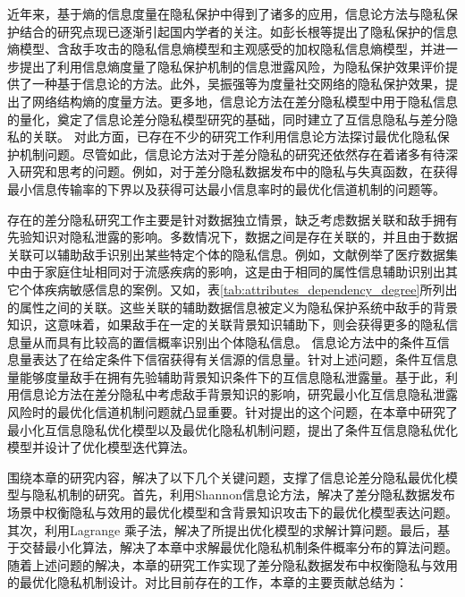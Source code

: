 近年来，基于熵的信息度量在隐私保护中得到了诸多的应用\cite{issa2016an,liao2019tunable,Chatzikokolakis2008Anonymity,sankar2013utility}，信息论方法与隐私保护结合的研究点现已逐渐引起国内学者的关注。如彭长根等\cite{peng2016}提出了隐私保护的信息熵模型、含敌手攻击的隐私信息熵模型和主观感受的加权隐私信息熵模型，并进一步提出了利用信息熵度量了隐私保护机制的信息泄露风险，为隐私保护效果评价提供了一种基于信息论的方法。此外，吴振强等\cite{zhenqiangwu2019}为度量社交网络的隐私保护效果，提出了网络结构熵的度量方法。更多地，信息论方法在差分隐私模型中用于隐私信息的量化，奠定了信息论差分隐私模型研究的基础\cite{mir2012information}，同时建立了互信息隐私与差分隐私的关联\cite{cuff2016differential}。 对此方面，已存在不少的研究工作\cite{kalantari2018robust,alvim2011differential,wang2016on,sarwate2014a,wang2015a,du2015Fundamental,xiong2016randomized}利用信息论方法探讨最优化隐私保护机制问题\cite{kalantari2016optimal,kairouz2016extremal}。尽管如此，信息论方法对于差分隐私的研究还依然存在着诸多有待深入研究和思考的问题。例如，对于差分隐私数据发布中的隐私与失真函数\cite{wang2016on}，在获得最小信息传输率的下界以及获得可达最小信息率时的最优化信道机制的问题等。

存在的差分隐私研究工作主要是针对数据独立情景，缺乏考虑数据关联和敌手拥有先验知识对隐私泄露的影响\cite{zhu2015correlated,li2019impact}。多数情况下，数据之间是存在关联的，并且由于数据关联可以辅助敌手识别出某些特定个体的隐私信息\cite{zhu2015correlated,yang2015bayesian}。例如，文献例举了医疗数据集中由于家庭住址相同对于流感疾病的影响，这是由于相同的属性信息辅助识别出其它个体疾病敏感信息的案例。又如，表\ref{tab:attributes_dependency_degree}所列出的属性之间的关联。这些关联的辅助数据信息被定义为隐私保护系统中敌手的背景知识，这意味着，如果敌手在一定的关联背景知识辅助下，则会获得更多的隐私信息量从而具有比较高的置信概率识别出个体隐私信息\cite{ningbowu2020}。 信息论方法中的条件互信息量表达了在给定条件下信宿获得有关信源的信息量。针对上述问题，条件互信息量能够度量敌手在拥有先验辅助背景知识条件下的互信息隐私泄露量。基于此，利用信息论方法在差分隐私中考虑敌手背景知识的影响，研究最小化互信息隐私泄露风险时的最优化信道机制问题就凸显重要。针对提出的这个问题，在本章中研究了最小化互信息隐私优化模型以及最优化隐私机制问题，提出了条件互信息隐私优化模型并设计了优化模型迭代算法。

围绕本章的研究内容，解决了以下几个关键问题，支撑了信息论差分隐私最优化模型与隐私机制的研究。首先，利用Shannon信息论方法，解决了差分隐私数据发布场景中权衡隐私与效用的最优化模型和含背景知识攻击下的最优化模型表达问题。其次，利用Lagrange 乘子法，解决了所提出优化模型的求解计算问题。最后，基于交替最小化算法，解决了本章中求解最优化隐私机制条件概率分布的算法问题。随着上述问题的解决，本章的研究工作实现了差分隐私数据发布中权衡隐私与效用的最优化隐私机制设计。对比目前存在的工作，本章的主要贡献总结为：

